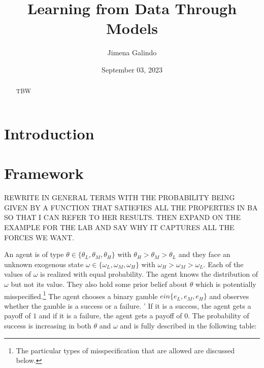 \documentclass[
  12pt,
]{article}
\title{Learning from Data Through Models}
\author{Jimena Galindo}
\date{September 03, 2023}
\begin{document}
\maketitle
\begin{abstract}
TBW
\end{abstract}

\hypertarget{introduction}{%
\section{Introduction}\label{introduction}}

\hypertarget{framework}{%
\section{Framework}\label{framework}}

REWRITE IN GENERAL TERMS WITH THE PROBABILITY BEING GIVEN BY A FUNCTION
THAT SATIEFIES ALL THE PROPERTIES IN BA SO THAT I CAN REFER TO HER
RESULTS. THEN EXPAND ON THE EXAMPLE FOR THE LAB AND SAY WHY IT CAPTURES
ALL THE FORCES WE WANT.

An agent is of type \(\theta \in \{\theta_L, \theta_M, \theta_H\}\) with
\(\theta_H > \theta_M > \theta_L\) and they face an unknown exogenous
state \(\omega \in \{\omega_L, \omega_M, \omega_H\}\) with
\(\omega_H>\omega_M>\omega_L\). Each of the values of \(\omega\) is
realized with equal probability. The agent knows the distribution of
\(\omega\) but not its value. They also hold some prior belief about
\(\theta\) which is potentially
misspecified.\footnote{The particular types of misspecification
that are allowed are discussed below.} The agent chooses a binary gamble
\(e in \{e_L, e_M, e_H\}\) and observes whether the gamble is a success
or a failure. ' If it is a success, the agent gets a payoff of \(1\) and
if it is a failure, the agent gets a payoff of \(0\). The probability of
success is increasing in both \(\theta\) and \(\omega\) and is fully
described in the following table:
\end{document}
